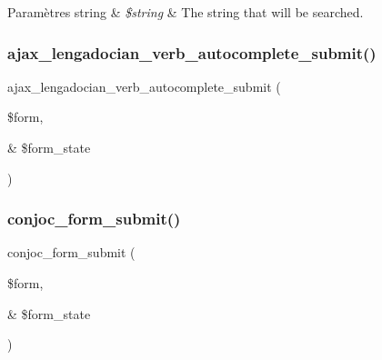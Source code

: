 \begin{DoxyParams}[1]{Paramètres}
string & {\em \$string} & The string that will be searched. \\
\hline
\end{DoxyParams}
\hypertarget{php_2conjoc__lengadocian__web_form_8inc_a2206d720f533b7b1afa6ac0568e740ef}{}\label{php_2conjoc__lengadocian__web_form_8inc_a2206d720f533b7b1afa6ac0568e740ef} 
\subsubsection{\texorpdfstring{ajax\+\_\+lengadocian\+\_\+verb\+\_\+autocomplete\+\_\+submit()}{ajax\_lengadocian\_verb\_autocomplete\_submit()}}
{\footnotesize\ttfamily ajax\+\_\+lengadocian\+\_\+verb\+\_\+autocomplete\+\_\+submit (\begin{DoxyParamCaption}\item[{}]{\$form,  }\item[{\&}]{\$form\+\_\+state }\end{DoxyParamCaption})}

\hypertarget{php_2conjoc__lengadocian__web_form_8inc_ad10d751f3d75ba568eb1f41bd43fcc94}{}\label{php_2conjoc__lengadocian__web_form_8inc_ad10d751f3d75ba568eb1f41bd43fcc94} 
\subsubsection{\texorpdfstring{conjoc\+\_\+form\+\_\+submit()}{conjoc\_form\_submit()}}
{\footnotesize\ttfamily conjoc\+\_\+form\+\_\+submit (\begin{DoxyParamCaption}\item[{}]{\$form,  }\item[{\&}]{\$form\+\_\+state }\end{DoxyParamCaption})}

